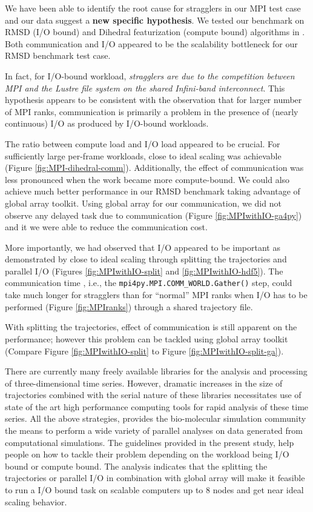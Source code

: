 \label{concl}

We have been able to identify the root cause for stragglers in our MPI test case and our data suggest a \textbf{new specific hypothesis}. 
We tested our benchmark on RMSD (I/O bound) and Dihedral featurization (compute bound) algorithms in .
Both communication and I/O appeared to be the scalability bottleneck for our RMSD benchmark test case.

In fact, for I/O-bound workload, \emph{stragglers are due to the competition between MPI and the Lustre file system on the shared Infini-band interconnect}. 
This hypothesis appears to be consistent with the observation that for larger number of MPI ranks, communication is primarily a problem in
the presence of (nearly continuous) I/O as produced by I/O-bound workloads.

The ratio between compute load and I/O load appeared to be crucial. 
For sufficiently large per-frame workloads, close to ideal scaling was achievable (Figure \ref{fig:MPI-dihedral-comm}). 
Additionally, the effect of communication was less pronounced when the work became more compute-bound.
We could also achieve much better performance in our RMSD benchmark taking advantage of global array toolkit. 
Using global array for our communication, we did not observe any delayed task due to communication (Figure \ref{fig:MPIwithIO-ga4py}) and 
it we were able to reduce the communication cost. 

More importantly, we had observed that I/O appeared to be important as demonstrated by close to ideal scaling through splitting the trajectories and parallel I/O (Figures
\ref{fig:MPIwithIO-split} and \ref{fig:MPIwithIO-hdf5}). 
The communication time \tcomm, i.e., the \texttt{mpi4py.MPI.COMM\_WORLD.Gather()} step, could take
much longer for stragglers than for ``normal'' MPI ranks when I/O has to be performed (Figure \ref{fig:MPIranks}) through a shared trajectory file. 

With splitting the trajectories, effect of communication is still apparent on the performance; however this problem can be tackled using 
global array toolkit (Compare Figure \ref{fig:MPIwithIO-split} to Figure \ref{fig:MPIwithIO-split-ga}).

There are currently many freely available libraries for the analysis and processing of three-dimensional time series.
However, dramatic increases in the size of trajectories combined with the serial nature of these libraries necessitates 
use of state of the art high performance computing tools for rapid analysis of these time series. 
All the above strategies, provides the bio-molecular simulation community the means to perform a wide variety of parallel analyses on data generated from computational simulations.
The guidelines provided in the present study, help people on how to tackle their problem depending on the workload being I/O bound or compute bound. 
The analysis indicates that the splitting the trajectories or parallel I/O in combination with global array will make it feasible to run a I/O bound task on scalable computers up to 8 nodes and get near ideal scaling behavior.